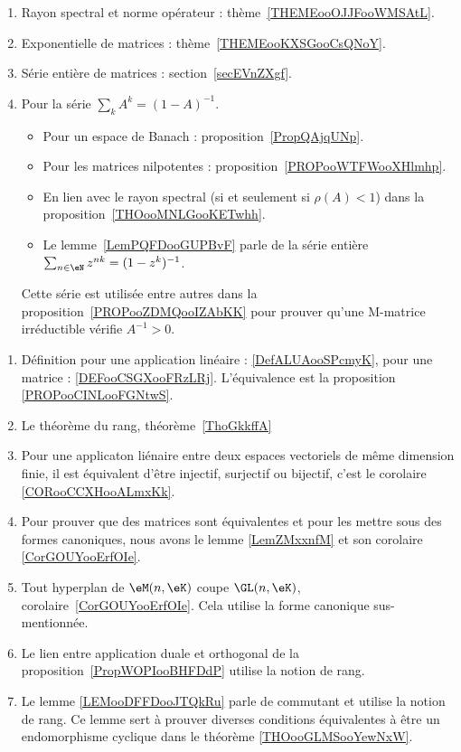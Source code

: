        \label{THEMEooPQKDooTAVKFH}

\begin{enumerate}
    \item
        Rayon spectral et norme opérateur : thème~\ref{THEMEooOJJFooWMSAtL}.
    \item
        Exponentielle de matrices : thème~\ref{THEMEooKXSGooCsQNoY}.
    \item
        Série entière de matrices : section~\ref{secEVnZXgf}.
    \item
        Pour la série \( \sum_kA^k=(1-A)^{-1}\).
        \begin{itemize}
            \item Pour un espace de Banach : proposition~\ref{PropQAjqUNp}.
            \item Pour les matrices nilpotentes : proposition~\ref{PROPooWTFWooXHlmhp}.
            \item En lien avec le rayon spectral (si et seulement si \( \rho(A)<1\)) dans la proposition~\ref{THOooMNLGooKETwhh}.
            \item Le lemme~\ref{LemPQFDooGUPBvF} parle de la série entière \( \sum_{n\in \eN}z^{nk}=(1-z^k)^{-1}\).
        \end{itemize}
        Cette série est utilisée entre autres dans la proposition~\ref{PROPooZDMQooIZAbKK} pour prouver qu'une M-matrice irréductible vérifie \( A^{-1}>0\).
\end{enumerate}


    \begin{enumerate}
        \item Définition pour une application linéaire : \ref{DefALUAooSPcmyK}, pour une matrice : \ref{DEFooCSGXooFRzLRj}. L'équivalence est la proposition \ref{PROPooCINLooFGNtwS}.
        \item Le théorème du rang, théorème~\ref{ThoGkkffA}
        \item Pour une applicaton liénaire entre deux espaces vectoriels de même dimension finie, il est équivalent d'être injectif, surjectif ou bijectif, c'est le corolaire \ref{CORooCCXHooALmxKk}.
        \item Pour prouver que des matrices sont équivalentes et pour les mettre sous des formes canoniques, nous avons le lemme \ref{LemZMxxnfM} et son corolaire \ref{CorGOUYooErfOIe}.
        \item Tout hyperplan de \( \eM(n,\eK)\) coupe \( \GL(n,\eK)\), corolaire~\ref{CorGOUYooErfOIe}. Cela utilise la forme canonique sus-mentionnée.
        \item Le lien entre application duale et orthogonal de la proposition~\ref{PropWOPIooBHFDdP} utilise la notion de rang.
        \item Le lemme \ref{LEMooDFFDooJTQkRu} parle de commutant et utilise la notion de rang. Ce lemme sert à prouver diverses conditions équivalentes à être un endomorphisme cyclique dans le théorème \ref{THOooGLMSooYewNxW}.
        \end{enumerate}


